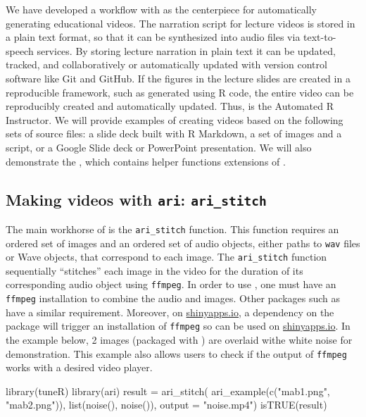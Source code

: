 We have developed a workflow with  as the centerpiece for
automatically generating educational videos. The narration script for
lecture videos is stored in a plain text format, so that it can be
synthesized into audio files via text-to-speech services. By storing
lecture narration in plain text it can be updated, tracked, and
collaboratively or automatically updated with version control software
like Git and GitHub. If the figures in the lecture slides are created in
a reproducible framework, such as generated using R code, the entire
video can be reproducibly created and automatically updated. Thus,
 is the Automated R Instructor. We will provide examples of
creating videos based on the following sets of source files: a slide
deck built with R Markdown, a set of images and a script, or a Google
Slide deck or PowerPoint presentation. We will also demonstrate the
, which contains helper functions extensions of
.

\hypertarget{making-videos-with-ari-ari_stitch}{%
\subsection{\texorpdfstring{Making videos with \texttt{ari}:
\texttt{ari\_stitch}}{Making videos with ari: ari\_stitch}}\label{making-videos-with-ari-ari_stitch}}

The main workhorse of  is the \texttt{ari\_stitch} function.
This function requires an ordered set of images and an ordered set of
audio objects, either paths to \texttt{wav} files or  Wave
objects, that correspond to each image. The \texttt{ari\_stitch}
function sequentially ``stitches'' each image in the video for the
duration of its corresponding audio object using \texttt{ffmpeg}. In
order to use , one must have an \texttt{ffmpeg} installation to
combine the audio and images. Other packages such as 
have a similar requirement. Moreover, on
\href{https://www.shinyapps.io/}{shinyapps.io}, a dependency on the
 package will trigger an installation of \texttt{ffmpeg}
so  can be used on
\href{https://www.shinyapps.io/}{shinyapps.io}. In the example below, 2
images (packaged with ) are overlaid withe white noise for
demonstration. This example also allows users to check if the output of
\texttt{ffmpeg} works with a desired video player.

\begin{Schunk}
\begin{Sinput}
library(tuneR)
library(ari)
result = ari_stitch(
  ari_example(c("mab1.png", "mab2.png")),
  list(noise(), noise()),
  output = "noise.mp4")
isTRUE(result)
\end{Sinput}
\end{Schunk}

